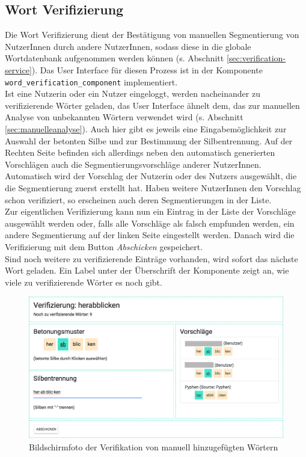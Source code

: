 \subsection{Wort Verifizierung}

Die Wort Verifizierung dient der Bestätigung von manuellen Segmentierung von NutzerInnen durch andere NutzerInnen, sodass diese in die globale Wortdatenbank aufgenommen werden können (s. Abschnitt \ref{sec:verification-service}). Das User Interface für diesen Prozess ist in der Komponente \texttt{word\_verification\_component} implementiert.\\

Ist eine Nutzerin oder ein Nutzer eingeloggt, werden nacheinander zu verifizierende Wörter geladen, das User Interface ähnelt dem, das zur manuellen Analyse von unbekannten Wörtern verwendet wird (s. Abschnitt \ref{sec:manuelleanalyse}). Auch hier gibt es jeweils eine Eingabemöglichkeit zur Auswahl der betonten Silbe und zur Bestimmung der Silbentrennung. Auf der Rechten Seite befinden sich allerdings neben den automatisch generierten Vorschlägen auch die Segmentierungsvorschläge anderer NutzerInnen. Automatisch wird der Vorschlag der Nutzerin oder des Nutzers ausgewählt, die die Segmentierung zuerst erstellt hat. Haben weitere NutzerInnen den Vorschlag schon verifiziert, so erscheinen auch deren Segmentierungen in der Liste. \\

Zur eigentlichen Verifizierung kann nun ein Eintrag in der Liste der Vorschläge ausgewählt werden oder, falls alle Vorschläge als falsch empfunden werden, ein andere Segmentierung auf der linken Seite eingestellt werden. Danach wird die Verifizierung mit dem Button \textit{Abschicken} gespeichert.\\
Sind noch weitere zu verifizierende Einträge vorhanden, wird sofort das nächste Wort geladen. Ein Label unter der Überschrift der Komponente zeigt an, wie viele zu verifizierende Wörter es noch gibt.

\begin{figure}[h!]
	\centering
	\includegraphics[width=.8\linewidth]{figures/frontend/verifizierung}
	\caption{Bildschirmfoto der Verifikation von manuell hinzugefügten Wörtern}
	\label{fig:frontend-verification}
\end{figure}
